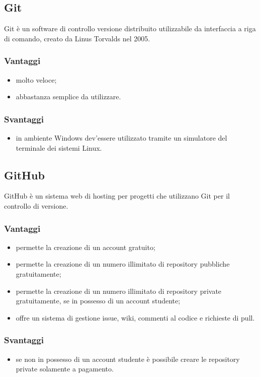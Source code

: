 \documentclass[../Tesi.tex]{subfiles}
\begin{document}
	\subsection{Git}
		Git è un software di controllo versione distribuito utilizzabile da interfaccia a riga di comando, creato da Linus Torvalds nel 2005.
		\subsubsection{Vantaggi}
			\begin{itemize}
				\item molto veloce;
				\item abbastanza semplice da utilizzare.
			\end{itemize}	
		\subsubsection{Svantaggi}
			\begin{itemize}
				\item in ambiente Windows dev'essere utilizzato tramite un simulatore del terminale dei sistemi Linux.
			\end{itemize}

	\subsection{GitHub}
		GitHub è un sistema web di hosting per progetti che utilizzano Git per il controllo di versione.
		\subsubsection{Vantaggi}
			\begin{itemize}
				\item permette la creazione di un account gratuito;
				\item permette la creazione di un numero illimitato di repository pubbliche gratuitamente;
				\item permette la creazione di un numero illimitato di repository private gratuitamente, se in possesso di un account studente;
				\item offre un sistema di gestione issue, wiki, commenti al codice e richieste di pull.
			\end{itemize}	
		\subsubsection{Svantaggi}
			\begin{itemize}
				\item se non in possesso di un account studente è possibile creare le repository private solamente a pagamento.
			\end{itemize}
\end{document}
